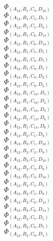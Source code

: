 \documentclass[14pt]{article}
\begin{document}
    $\Phi_{({A}_{12}, {B}_{1}, {C}_{3}, {D}_{10})}$ \\ 
    $\Phi_{({A}_{12}, {B}_{1}, {C}_{5}, {D}_{7})}$ \\ 
    $\Phi_{({A}_{12}, {B}_{1}, {C}_{5}, {D}_{8})}$ \\ 
    $\Phi_{({A}_{12}, {B}_{1}, {C}_{6}, {D}_{13})}$ \\ 
    $\Phi_{({A}_{12}, {B}_{1}, {C}_{6}, {D}_{14})}$ \\ 
    $\Phi_{({A}_{12}, {B}_{1}, {C}_{7}, {D}_{5})}$ \\ 
    $\Phi_{({A}_{12}, {B}_{1}, {C}_{8}, {D}_{5})}$ \\ 
    $\Phi_{({A}_{12}, {B}_{1}, {C}_{9}, {D}_{1})}$ \\ 
    $\Phi_{({A}_{12}, {B}_{1}, {C}_{9}, {D}_{2})}$ \\ 
    $\Phi_{({A}_{12}, {B}_{1}, {C}_{9}, {D}_{3})}$ \\ 
    $\Phi_{({A}_{12}, {B}_{1}, {C}_{10}, {D}_{1})}$ \\ 
    $\Phi_{({A}_{12}, {B}_{1}, {C}_{10}, {D}_{2})}$ \\ 
    $\Phi_{({A}_{12}, {B}_{1}, {C}_{10}, {D}_{3})}$ \\ 
    $\Phi_{({A}_{12}, {B}_{1}, {C}_{13}, {D}_{6})}$ \\ 
    $\Phi_{({A}_{12}, {B}_{1}, {C}_{14}, {D}_{6})}$ \\ 
    $\Phi_{({A}_{12}, {B}_{2}, {C}_{1}, {D}_{9})}$ \\ 
    $\Phi_{({A}_{12}, {B}_{2}, {C}_{1}, {D}_{10})}$ \\ 
    $\Phi_{({A}_{12}, {B}_{2}, {C}_{2}, {D}_{9})}$ \\ 
    $\Phi_{({A}_{12}, {B}_{2}, {C}_{2}, {D}_{10})}$ \\ 
    $\Phi_{({A}_{12}, {B}_{2}, {C}_{3}, {D}_{9})}$ \\ 
    $\Phi_{({A}_{12}, {B}_{2}, {C}_{3}, {D}_{10})}$ \\ 
    $\Phi_{({A}_{12}, {B}_{2}, {C}_{5}, {D}_{7})}$ \\ 
    $\Phi_{({A}_{12}, {B}_{2}, {C}_{5}, {D}_{8})}$ \\ 
    $\Phi_{({A}_{12}, {B}_{2}, {C}_{6}, {D}_{13})}$ \\ 
    $\Phi_{({A}_{12}, {B}_{2}, {C}_{6}, {D}_{14})}$ \\ 
    $\Phi_{({A}_{12}, {B}_{2}, {C}_{7}, {D}_{5})}$ \\ 
    $\Phi_{({A}_{12}, {B}_{2}, {C}_{8}, {D}_{5})}$ \\ 
    $\Phi_{({A}_{12}, {B}_{2}, {C}_{9}, {D}_{1})}$ \\ 
\end{document}
